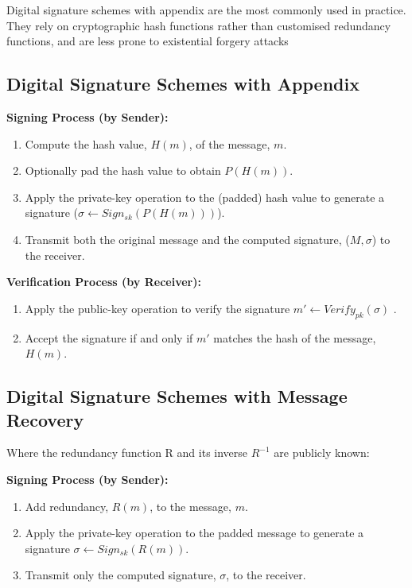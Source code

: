\documentclass[]{final_report}
\theoremstyle{definition}
\begin{document}
Digital signature schemes with appendix are the most commonly used in practice. They rely on cryptographic hash functions rather than customised redundancy functions, and are less prone to existential forgery attacks

\subsection{Digital Signature Schemes with Appendix}
\textbf{Signing Process (by Sender):}
\begin{enumerate}
    \item Compute the hash value, \( H(m) \), of the message, \( m \).
    \item Optionally pad the hash value to obtain \( P(H(m)) \).
    \item Apply the private-key operation to the (padded) hash value to generate a signature (\( \sigma \leftarrow Sign_{sk}(P(H(m))) \)).  
     \item Transmit both the original message and the computed signature, ($M, \sigma$) to the receiver.
\end{enumerate}

\textbf{Verification Process (by Receiver):}
\begin{enumerate}
    \item Apply the public-key operation to verify the signature \( m' \leftarrow Verify_{pk}(\sigma) \) .
    \item Accept the signature if and only if \( m' \) matches the hash of the message, \( H(m) \).
\end{enumerate}

\subsection{Digital Signature Schemes with Message Recovery}
Where the redundancy function R and its inverse $R^{-1}$ are publicly known:

\textbf{Signing Process (by Sender):}
\begin{enumerate}
    \item Add redundancy, \( R(m) \), to the message, \( m \).
    \item Apply the private-key operation to the padded message to generate a signature \( \sigma \leftarrow Sign_{sk}(R(m)) \).
    \item Transmit only the computed signature, \( \sigma \), to the receiver.
\end{enumerate}
\end{document}
